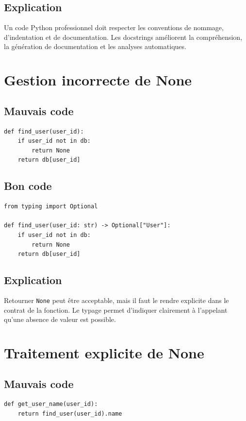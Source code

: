 \documentclass[a4paper,11pt]{report}
\begin{document}
\section{Explication}
Un code Python professionnel doit respecter les conventions de nommage, d'indentation et de documentation.
Les docstrings améliorent la compréhension, la génération de documentation et les analyses automatiques.

\chapter{Gestion incorrecte de None}

\section{Mauvais code}
\begin{lstlisting}
def find_user(user_id):
    if user_id not in db:
        return None
    return db[user_id]
\end{lstlisting}

\section{Bon code}
\begin{lstlisting}
from typing import Optional

def find_user(user_id: str) -> Optional["User"]:
    if user_id not in db:
        return None
    return db[user_id]
\end{lstlisting}

\section{Explication}
Retourner \texttt{None} peut être acceptable, mais il faut le rendre explicite dans le contrat de la fonction.
Le typage permet d'indiquer clairement à l'appelant qu'une absence de valeur est possible.

\chapter{Traitement explicite de None}

\section{Mauvais code}
\begin{lstlisting}
def get_user_name(user_id):
    return find_user(user_id).name
\end{lstlisting}
\end{document}
